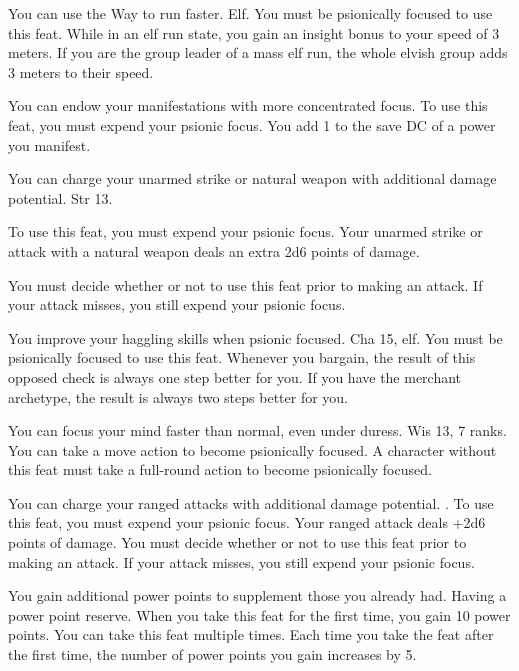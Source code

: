{You can use the Way to run faster.}
{Elf.}
{You must be psionically focused to use this feat. While in an elf run state, you gain an insight bonus to your speed of 3 meters. If you are the group leader of a mass elf run, the whole elvish group adds 3 meters to their speed.}
{}{}

{You can endow your manifestations with more concentrated focus.}
{}
{To use this feat, you must expend your psionic focus. You add 1 to the save DC of a power you manifest.}
{}{}

{You can charge your unarmed strike or natural weapon with additional damage potential.}
{Str 13.}
{To use this feat, you must expend your psionic focus. Your unarmed strike or attack with a natural weapon deals an extra 2d6 points of damage.

You must decide whether or not to use this feat prior to making an attack. If your attack misses, you still expend your psionic focus.}
{}{}

{You improve your haggling skills when psionic focused.}
{Cha 15, elf.}
{You must be psionically focused to use this feat. Whenever you bargain, the result of this  opposed check is always one step better for you.}
{}
{If you have the merchant archetype, the result is always two steps better for you.}

{You can focus your mind faster than normal, even under duress.}
{Wis 13,  7 ranks.}
{You can take a move action to become psionically focused.}
{A character without this feat must take a full-round action to become psionically focused.}
{}

{You can charge your ranged attacks with additional damage potential.}
{.}
{To use this feat, you must expend your psionic focus. Your ranged attack deals +2d6 points of damage. You must decide whether or not to use this feat prior to making an attack. If your attack misses, you still expend your psionic focus.}
{}{}

{You gain additional power points to supplement those you already had.}
{Having a power point reserve.}
{When you take this feat for the first time, you gain 10 power points.}
{}
{You can take this feat multiple times. Each time you take the feat after the first time, the number of power points you gain increases by 5.}

